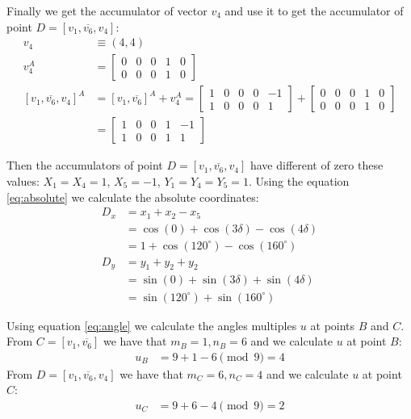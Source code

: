 \documentclass[11pt]{article}
\begin{document}
Finally we get the accumulator of vector $v_4$ and use it to get the accumulator of point $D = [v_1,\overline{v_6},v_4]$:
\begin{align}
v_4 &\equiv (4,4)\nonumber\\
v_4^A &= \left[\begin{array}{ccccc}0&0&0&1&0 \\ 0&0&0&1&0 \end{array}\right]\\
[v_1, \overline{v_6}, v_4]^A &= [v_1, \overline{v_6}]^A + v_4^A
 = \left[\begin{array}{ccccc}1&0&0&0&-1 \\ 1&0&0&0&1 \end{array}\right]
 + \left[\begin{array}{ccccc}0&0&0&1&0 \\ 0&0&0&1&0 \end{array}\right]\\
 &= \left[\begin{array}{ccccc}1&0&0&1&-1 \\ 1&0&0&1&1 \end{array}\right]
\end{align}

Then the accumulators of point $D = [v_1,\overline{v_6},v_4]$ have different of zero these values: $X_1=X_4=1$, $X_5=-1$, $Y_1=Y_4=Y_5=1$. Using the equation \ref{eq:absolute} we calculate the absolute coordinates:
\begin{align*}
D_x &= x_1 + x_2 - x_5\\
    &= \cos(0) + \cos(3\delta) - \cos(4\delta)\\
    &= 1 + \cos(120^\circ) - \cos(160^\circ)\\
D_y &= y_1 + y_2 + y_2\nonumber\\
    &= \sin(0) + \sin(3\delta) + \sin(4\delta)\\
    &= \sin(120^\circ) + \sin(160^\circ)
\end{align*}

Using equation \ref{eq:angle} we calculate the angles multiples $u$ at points $B$ and $C$. From $C=[v_1,\overline{v_6}]$ we have that $m_B=1,n_B=6$ and we calculate $u$ at point $B$:
\begin{align}
u_B &= 9 + 1 - 6 \pmod{9} = 4
\end{align}
From $D = [v_1,\overline{v_6},v_4]$ we have that $m_C=6,n_C=4$ and we calculate $u$ at point $C$:
\begin{align}
u_C &= 9 + 6 - 4 \pmod{9} = 2
\end{align}
\end{document}
